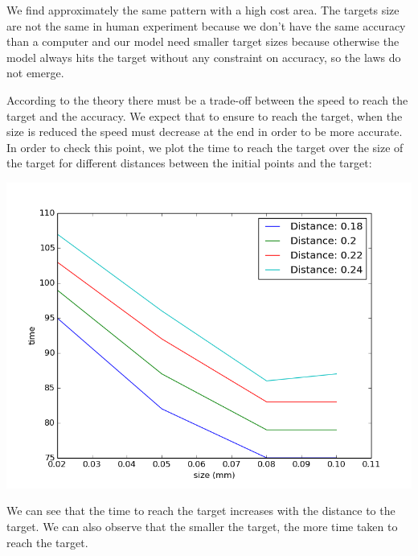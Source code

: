 \documentclass[pdftex,a4paper,11pt]{report}
\begin{document}
We find approximately the same pattern with a high cost area. The targets size are not the same in human experiment because we don't have the same accuracy than a computer and our model need smaller target sizes because otherwise the model always hits the target without any constraint on accuracy, so the laws do not emerge.

According to the theory there must be a trade-off between the speed to reach the target and the accuracy. We expect that to ensure to reach the target, when the size is reduced the speed must decrease at the end in order to be more accurate.
In order to check this point, we plot the time to reach the target over the size of the target for different distances between the initial points and the target:
\begin{center}
\includegraphics[scale=0.5]{figures/timeDistance.png}
\end{center}
We can see that the time to reach the target increases with the distance to the target.
We can also observe that the smaller the target, the more time taken to reach the target.
\end{document}
